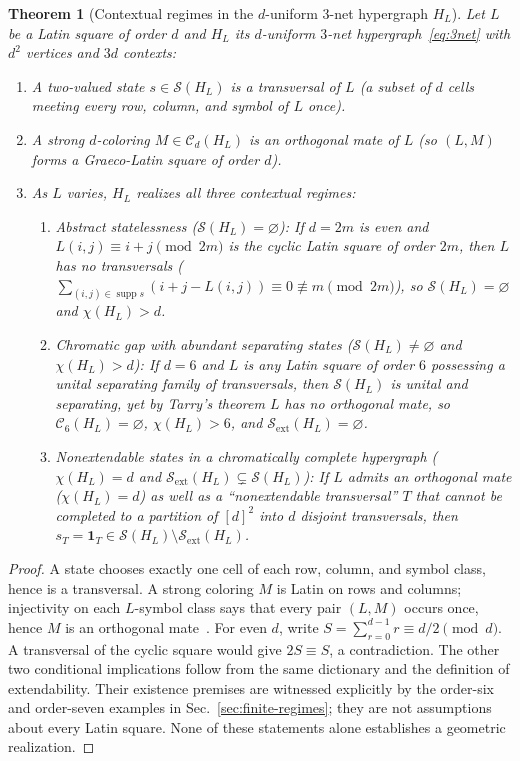 \documentclass[aps,pra,reprint,superscriptaddress,longbibliography,nofootinbib,floatfix,10pt]{revtex4-2}
\newtheorem{theorem}{Theorem}
\theoremstyle{definition}\newtheorem{definition}[theorem]{Definition}
\theoremstyle{remark}\newtheorem{remark}[theorem]{Remark}
\newcommand{\Sc}{\mathcal S}\newcommand{\Cc}{\mathcal C}
\DeclareMathOperator{\supp}{supp}\DeclareMathOperator{\conv}{conv}
\begin{document}
\begin{theorem}[Contextual regimes in the $d$-uniform $3$-net hypergraph $H_L$]\label{thm:3net}
Let $L$ be a Latin square of order $d$ and $H_L$ its $d$-uniform $3$-net hypergraph~\eqref{eq:3net} with $d^2$ vertices and $3d$ contexts:
\begin{enumerate}
\item A two-valued state $s\in\Sc(H_L)$ is a \emph{transversal} of $L$ (a subset of $d$ cells meeting every row, column, and symbol of $L$ once).
\item A strong $d$-coloring $M\in\Cc_d(H_L)$ is an \emph{orthogonal mate} of $L$ (so $(L,M)$ forms a Graeco-Latin square of order $d$).
\item As $L$ varies, $H_L$ realizes all three contextual regimes:
\begin{enumerate}
\item \emph{Abstract statelessness ($\Sc(H_L)=\varnothing$):} If $d=2m$ is even and $L(i,j)\equiv i+j\pmod{2m}$ is the cyclic Latin square of order $2m$, then $L$ has no transversals ($\sum_{(i,j)\in\supp s}(i+j-L(i,j))\equiv 0\not\equiv m\pmod{2m}$), so $\Sc(H_L)=\varnothing$ and $\chi(H_L)>d$.
\item \emph{Chromatic gap with abundant separating states ($\Sc(H_L)\neq\varnothing$ and $\chi(H_L)>d$):} If $d=6$ and $L$ is any Latin square of order $6$ possessing a unital separating family of transversals, then $\Sc(H_L)$ is unital and separating, yet by Tarry's theorem $L$ has no orthogonal mate, so $\Cc_6(H_L)=\varnothing$, $\chi(H_L)>6$, and $\Sc_{\mathrm{ext}}(H_L)=\varnothing$.
\item \emph{Nonextendable states in a chromatically complete hypergraph ($\chi(H_L)=d$ and $\Sc_{\mathrm{ext}}(H_L)\subsetneq\Sc(H_L)$):} If $L$ admits an orthogonal mate ($\chi(H_L)=d$) as well as a ``nonextendable transversal'' $T$ that cannot be completed to a partition of $[d]^2$ into $d$ disjoint transversals, then $s_T=\mathbf{1}_T\in\Sc(H_L)\setminus\Sc_{\mathrm{ext}}(H_L)$.
\end{enumerate}
\end{enumerate}
\end{theorem}

\begin{proof}
A state chooses exactly one cell of each row, column, and symbol class, hence is a transversal. A strong coloring $M$ is Latin on rows and columns; injectivity on each $L$-symbol class says that every pair $(L,M)$ occurs once, hence $M$ is an orthogonal mate~\cite{besharati2016latin}. For even $d$, write $S=\sum_{r=0}^{d-1}r\equiv d/2\pmod d$. A transversal of the cyclic square would give $2S\equiv S$, a contradiction. The other two conditional implications follow from the same dictionary and the definition of extendability. Their existence premises are witnessed explicitly by the order-six and order-seven examples in Sec.~\ref{sec:finite-regimes}; they are not assumptions about every Latin square. None of these statements alone establishes a geometric realization.
\end{proof}
\end{document}
